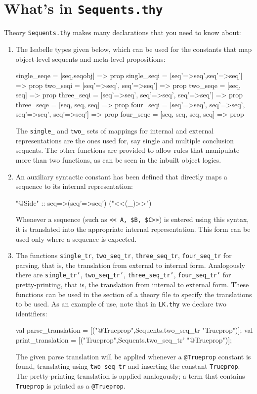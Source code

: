 \section{What's in \texttt{Sequents.thy}}

Theory \texttt{Sequents.thy} makes many declarations that you need to know
about: 
\begin{enumerate}
\item The Isabelle types given below, which can be used for the
constants that map object-level sequents and meta-level propositions:
%
\begin{ttbox}
 single_seqe = [seq,seqobj] => prop
 single_seqi = [seq'=>seq',seq'=>seq'] => prop
 two_seqi    = [seq'=>seq', seq'=>seq'] => prop
 two_seqe    = [seq, seq] => prop
 three_seqi  = [seq'=>seq', seq'=>seq', seq'=>seq'] => prop
 three_seqe  = [seq, seq, seq] => prop
 four_seqi   = [seq'=>seq', seq'=>seq', seq'=>seq', seq'=>seq'] => prop
 four_seqe   = [seq, seq, seq, seq] => prop
\end{ttbox}

The \verb|single_| and \verb|two_| sets of mappings for internal and
external representations are the ones used for, say single and
multiple conclusion sequents. The other functions are provided to
allow rules that manipulate more than two functions, as can be seen in
the inbuilt object logics.

\item An auxiliary syntactic constant has been
defined that directly maps a sequence to its internal representation:
\begin{ttbox}
"@Side"  :: seq=>(seq'=>seq')     ("<<(_)>>")
\end{ttbox}
Whenever a sequence (such as \verb|<< A, $B, $C>>|) is entered using this
syntax, it is translated into the appropriate internal representation.  This
form can be used only where a sequence is expected.

\item The \ML{} functions \texttt{single\_tr}, \texttt{two\_seq\_tr},
  \texttt{three\_seq\_tr}, \texttt{four\_seq\_tr} for parsing, that is, the
  translation from external to internal form.  Analogously there are
  \texttt{single\_tr'}, \texttt{two\_seq\_tr'}, \texttt{three\_seq\_tr'},
  \texttt{four\_seq\_tr'} for pretty-printing, that is, the translation from
  internal to external form.  These functions can be used in the \ML{} section
  of a theory file to specify the translations to be used.  As an example of
  use, note that in {\tt LK.thy} we declare two identifiers:
\begin{ttbox}
val parse_translation =
    [("@Trueprop",Sequents.two_seq_tr "Trueprop")];
val print_translation =
    [("Trueprop",Sequents.two_seq_tr' "@Trueprop")];
\end{ttbox}
The given parse translation will be applied whenever a \verb|@Trueprop|
constant is found, translating using \verb|two_seq_tr| and inserting the
constant \verb|Trueprop|.  The pretty-printing translation is applied
analogously; a term that contains \verb|Trueprop| is printed as a
\verb|@Trueprop|.
\end{enumerate}


